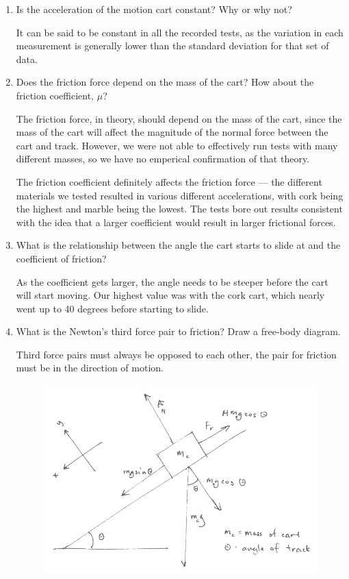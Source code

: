 \begin{enumerate}

\item Is the acceleration of the motion cart constant? Why or why not?

It can be said to be constant in all the recorded tests, as the variation in each measurement is generally lower than the standard deviation for that set of data.

\item Does the friction force depend on the mass of the cart? How about the friction coefficient, \begin{math}\mu\end{math}?

The friction force, in theory, should depend on the mass of the cart, since the mass of the cart will affect the magnitude of the normal force between the cart and track.
However, we were not able to effectively run tests with many different masses, so we have no emperical confirmation of that theory.

The friction coefficient definitely affects the friction force --- the different materials we tested resulted in various different accelerations, with cork being the highest and marble being the lowest.
The tests bore out results consistent with the idea that a larger coefficient would result in larger frictional forces.

\item What is the relationship between the angle the cart starts to slide at and the coefficient of friction?

As the coefficient gets larger, the angle needs to be steeper before the cart will start moving.
Our highest value was with the cork cart, which nearly went up to 40 degrees before starting to slide.

\item What is the Newton's third force pair to friction? Draw a free-body diagram.

Third force pairs must always be opposed to each other, the pair for friction must be in the direction of motion.

\begin{figure}[h]

\begin{center}
\includegraphics[scale=0.3]{content/fig2}
\end{center}


\end{figure}
\end{enumerate}

